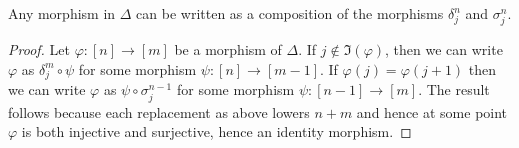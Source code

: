 \begin{lemma}
\label{lemma-face-degeneracy}
Any morphism in $\Delta$ can be written as a composition
of the morphisms $\delta^n_j$ and $\sigma^n_j$.
\end{lemma}

\begin{proof}
Let $\varphi : [n] \to [m]$ be a morphism of $\Delta$.
If $j \not \in \Im(\varphi)$, then we can write
$\varphi$ as $\delta^m_j \circ \psi$ for some morphism
$\psi : [n] \to [m - 1]$. If $\varphi(j) = \varphi(j + 1)$
then we can write $\varphi$ as $\psi \circ \sigma^{n - 1}_j$
for some morphism $\psi : [n - 1] \to [m]$.
The result follows because each replacement
as above lowers $n + m$ and hence at some point
$\varphi$ is both injective and surjective, hence
an identity morphism.
\end{proof}

